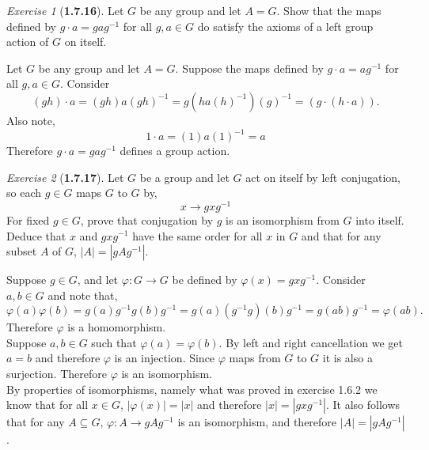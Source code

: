 \documentclass[12pt]{amsart}
\makeatletter
\theoremstyle{remark}
\newtheorem*{exercise}{Exercise}%
\renewenvironment{proof}[1][\proofname]{\par\doublespacing
  \pushQED{\qed}%
  \normalfont \topsep6\p@\@plus6\p@\relax
  \list{}{%
    \settowidth{\leftmargin}{\itshape\proofname:\hskip\labelsep}%
    \setlength{\labelwidth}{0pt}%
    \setlength{\itemindent}{-\leftmargin}%
  }%
  \item[\hskip\labelsep\itshape#1\@addpunct{:}]\ignorespaces
}{%
  \popQED\endlist\@endpefalse
  \singlespacing
}
\theoremstyle{mycomment}
\makeatother
\begin{document}
\begin{exercise}[\textbf{1.7.16}] Let $G$ be any group and let $A = G$. Show that the maps defined by $g \cdot a = gag^{-1}$ for all 
  $g, a \in G$ do satisfy the axioms of a left group action of $G$ on itself. 
  \begin{proof} Let $G$ be any group and let $A = G$. Suppose the maps defined by $g \cdot a = ag^{-1}$ for all $g, a \in G$. Consider 
    \begin{equation*}
      (gh) \cdot a = (gh)a(gh)^{-1} = g(ha(h)^{-1})(g)^{-1} = (g\cdot(h \cdot a)). 
    \end{equation*}
    Also note, 
    \begin{equation*}
      1 \cdot a = (1) a (1)^{-1} = a
    \end{equation*}
    Therefore $g \cdot a = gag^{-1}$  defines a group action. 
  \end{proof}
\end{exercise}
\vspace{.15in}


\begin{exercise}[\textbf{1.7.17}] Let $G$ be a group and let $G$ act on itself by left conjugation, so each $g \in G$ maps $G$ to $G$
  by, 
  \begin{equation*}
    x \to gxg^{-1}
  \end{equation*}
  For fixed $g\in G$, prove that conjugation by $g$ is an isomorphism from $G$ into itself. Deduce that $x$ and $gxg^{-1}$ have the same order for 
  all $x$ in $G$ and that for any subset $A$ of $G$, $|A| = |gAg^{-1}|$.  
  \begin{proof} Suppose $g \in G$, and let $\varphi: G \to G$ be defined by $\varphi(x) =  gxg^{-1}$. Consider $a, b \in G$ and 
    note that, 
    \begin{equation*}
      \varphi(a)\varphi(b) = g(a)g^{-1}g(b)g^{-1} = g(a)(g^{-1}g)(b)g^{-1} = g(ab)g^{-1} = \varphi(ab). 
    \end{equation*}
    Therefore $\varphi$ is a homomorphism.\\
    Suppose $a, b \in G$ such that $\varphi(a) = \varphi(b)$. By left and right cancellation we get $a = b$ and therefore $\varphi$ is an injection. Since 
    $\varphi$ maps from $G$ to $G$ it is also a surjection. Therefore $\varphi$ is an isomorphism. \\
    By properties of isomorphisms, namely what was proved in exercise 1.6.2 we know that for all $x \in G$, $|\varphi(x)| = |x|$ and therefore $|x| = |gxg^{-1}|$.
    It also follows that for any $A \subseteq G$, $\varphi: A \to gAg^{-1}$ is an isomorphism, and therefore $|A| = |gAg^{-1}|$.
  \end{proof}
\end{exercise}
\vspace{.15in}
\end{document}
